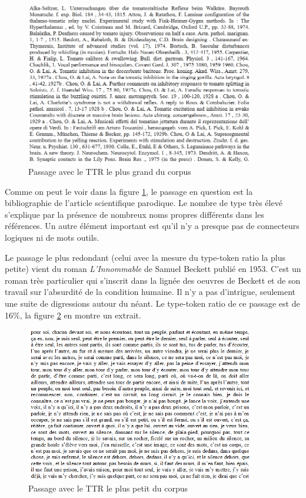 \documentclass[a4paper,twoside,12pt]{book}
\begin{document}
\bigskip
\begin{figure}[!ht]
    \centering
    \includegraphics[width=10cm]{img/11_passage_tt_grand.png}
    \caption{Passage avec le TTR le plus grand du corpus}
    \label{cantatrix}
\end{figure}
\bigskip

Comme on peut le voir dans la figure \ref{cantatrix}, le passage en question est la bibliographie de l'article scientifique parodique. Le nombre de type très élevé s'explique par la présence de nombreux noms propres différents dans les références. Un autre élément important est qu'il n'y a presque pas de connecteurs logiques ni de mots outils. 

Le passage le plus redondant (celui avec la mesure du type-token ratio la plus petite) vient du roman \textit{L'Innommable} de Samuel Beckett publié en 1953. C'est un roman très particulier qui s'inscrit dans la lignée des oeuvres de Beckett et de son travail sur l'absurdité de la condition humaine. Il n'y a pas d'intrigue, seulement une suite de digressions autour du néant. Le type-token ratio de ce passage est de 16\%, la figure \ref{innommable} en montre un extrait.

\bigskip
\begin{figure}[!ht]
    \centering
    \includegraphics[width=10cm]{img/12_passage_tt_petit.PNG}
    \caption{Passage avec le TTR le plus petit du corpus}
    \label{innommable}
\end{figure}
\bigskip
\end{document}
